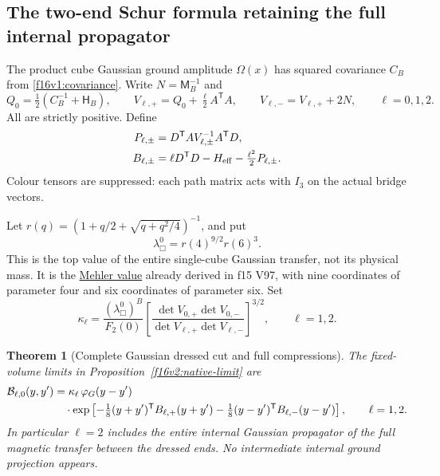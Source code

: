 \documentclass[11pt,oneside]{article}
\newtheorem{theorem}{Theorem}[section]
\begin{document}
\subsection{The two-end Schur formula retaining the full internal propagator}

The product cube Gaussian ground amplitude \(\Omega(x)\)
has squared covariance \(C_B\) from \eqref{f16v1:covariance}.
Write \(N=\mathsf M_B^{-1}\) and
\begin{equation}
 Q_0=\tfrac12(C_B^{-1}+\mathsf H_B),\qquad
 V_{\ell,+}=Q_0+\tfrac\ell2 A^{\mathsf T}A,\qquad
 V_{\ell,-}=V_{\ell,+}+2N,\qquad \ell=0,1,2.
 \label{f16v2:V}
\end{equation}
All are strictly positive. Define
\begin{align}
 P_{\ell,\pm}&=D^{\mathsf T}A V_{\ell,\pm}^{-1}A^{\mathsf T}D,
 \notag\\
 B_{\ell,\pm}
       &=\ell D^{\mathsf T}D-H_{\rm eff}
                              -\tfrac{\ell^2}{2}P_{\ell,\pm}.
 \label{f16v2:B}
\end{align}
Colour tensors are suppressed: each path matrix acts with \(I_3\)
on the actual bridge vectors.

Let \(r(q)=(1+q/2+\sqrt{q+q^2/4})^{-1}\), and put
\[
                   \lambda_\Box^0=r(4)^{9/2}r(6)^3.
\]
This is the top value of the entire single-cube Gaussian
transfer, not its physical mass. It is the
\href{https://dlmf.nist.gov/18.18.E28}{Mehler value}
already derived in f15 V97, with nine coordinates of parameter
four and six coordinates of parameter six.
Set
\begin{equation}
 \kappa_\ell
 =\frac{(\lambda_\Box^0)^B}{F_2(0)}
   \left[
    \frac{\det V_{0,+}\det V_{0,-}}
         {\det V_{\ell,+}\det V_{\ell,-}}
   \right]^{3/2},\qquad \ell=1,2.
 \label{f16v2:kappa}
\end{equation}

\begin{theorem}[Complete Gaussian dressed cut and full compressions]
\label{f16v2:schur}
The fixed-volume limits in Proposition~\ref{f16v2:native-limit} are
\begin{align}
 \mathcal B_{\ell,0}(y,y')
 &=\kappa_\ell\,\varphi_G(y-y') \notag\\
 &\quad\cdot
 \exp\left[-\tfrac18(y+y')^{\mathsf T}B_{\ell,+}(y+y')
           -\tfrac18(y-y')^{\mathsf T}B_{\ell,-}(y-y')\right],
       \qquad \ell=1,2.
 \label{f16v2:schur-kernel}
\end{align}
In particular \(\ell=2\) includes the entire internal Gaussian
propagator of the full magnetic transfer between the dressed ends.
No intermediate internal ground projection appears.
\end{theorem}
\end{document}
